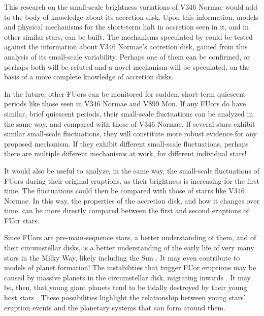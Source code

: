 \documentclass[iop,apj,tighten]{emulateapj}
\begin{document}
This research on the small-scale brightness variations of V346 Normae would add to the body of knowledge about its accretion disk. Upon this information, models and physical mechanisms for the short-term halt in accretion seen in it, and in other similar stars, can be built. The mechanisms speculated by \cite{ninan2015v899} could be tested against the information about V346 Normae's accretion disk, gained from this analysis of its small-scale variability. Perhaps one of them can be confirmed, or perhaps both will be refuted and a novel mechanism will be speculated, on the basis of a more complete knowledge of accretion disks.

In the future, other FUors can be monitored for sudden, short-term quiescent periods like those seen in V346 Normae and V899 Mon. If any FUors do have similar, brief quiescent periods, their small-scale fluctuations can be analyzed in the same way, and compared with those of V346 Normae. If several stars exhibit similar small-scale fluctuations, they will constitute more robust evidence for any proposed mechanism. If they exhibit different small-scale fluctuations, perhaps there are multiple different mechanisms at work, for different individual stars!

It would also be useful to analyze, in the same way, the small-scale fluctuations of FUors during their original eruptions, as their brightness is increasing for the first time. The fluctuations could then be compared with those of starrs like V346 Normae. In this way, the properties of the accretion disk, and how it changes over time, can be more directly compared between the first and second eruptions of FUor stars.

Since FUors are pre-main-sequence stars, a better understanding of them, and of their circumstellar disks, is a better understanding of the early life of very many stars in the Milky Way, likely including the Sun \citep{herbig_eruptive_1977}. It may even contribute to models of planet formation! The instabilities that trigger FUor eruptions may be caused by massive planets in the circumstellar disk, migrating inwards \citep{lodato2004massive}. It may be, then, that young giant planets tend to be tidally destroyed by their young host stars \citep{nayakshin2012fu}. These possibilities highlight the relationship between young stars' eruption events and the planetary systems that can form around them.

\newpage



\end{document}
